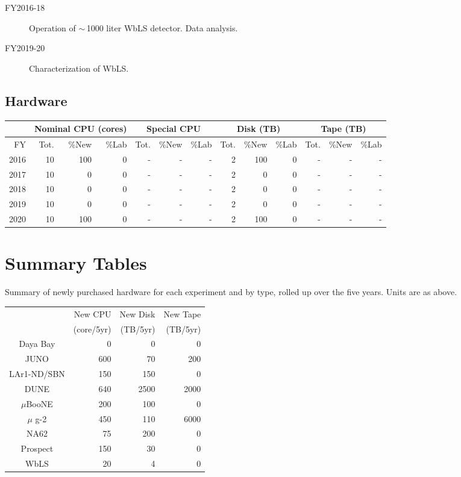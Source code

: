 \documentclass[pdftex,12pt,letter]{article}
\begin{document}
\begin{description}

\item[FY2016-18] Operation of $\sim$\,1000 liter WbLS detector. Data analysis.
                \item [FY2019-20] Characterization of WbLS. 
\end{description}

\subsection{Hardware}

\begin{tabular}[h]{|r || r|r|r || r|r|r || r|r|r || r|r|r ||}
  \hline
   & \multicolumn{3}{c||}{Nominal CPU (cores)} & \multicolumn{3}{c||}{Special CPU} & \multicolumn{3}{c||}{Disk (TB)} & \multicolumn{3}{c||}{Tape (TB)} \\
   \hline
  FY & Tot. & \%New & \%Lab & Tot. & \%New & \%Lab & Tot. & \%New & \%Lab & Tot. & \%New & \%Lab \\
  \hline
  2016 & 10 & 100& 0&- &- &- & 2& 100 & 0&- &- &- \\
  \hline
  2017 & 10&    0& 0&- &- &- & 2& 0& 0&- &- &-  \\
  \hline
  2018 & 10&    0& 0&- &- &- & 2& 0& 0&- &- &-  \\
  \hline
  2019 & 10&    0& 0&- &- &- & 2& 0& 0&- &- &-  \\
  \hline
  2020 & 10&  100& 0&- &- &- & 2& 100& 0&- &- &-  \\
  \hline
\end{tabular}

%

\pagebreak
\section{Summary Tables}

Summary of newly purchased hardware for each experiment and by type,
rolled up over the five years.
Units are as above.

\begin{center}
  
\begin{tabular}[h]{|c||r|r|r|}
\hline
    & New CPU    & New Disk & New Tape \\
    & (core/5yr) & (TB/5yr) & (TB/5yr) \\
\hline
Daya Bay & 0 & 0 & 0 \\
\hline
JUNO & 600 & 70 & 200 \\
\hline
LAr1-ND/SBN & 150 & 150 & 0 \\
\hline
DUNE & 640 & 2500 & 2000 \\
\hline
$\mu$BooNE & 200 & 100 & 0 \\
\hline
$\mu$ g-2 & 450 & 110 & 6000 \\
\hline
NA62 & 75 & 200 & 0 \\
\hline
Prospect & 150 & 30 & 0 \\
\hline
WbLS & 20 & 4 & 0 \\
\hline
\end{tabular}

\end{center}
\end{document}
